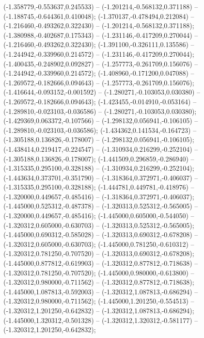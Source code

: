  (-1.358779,-0.553637,0.245533) -- (-1.201214,-0.568132,0.371188) -- (-1.188745,-0.644361,0.410048);
 (-1.370137,-0.478494,0.212084) -- (-1.216460,-0.493262,0.322430) -- (-1.201214,-0.568132,0.371188);
 (-1.380988,-0.402687,0.175343) -- (-1.231146,-0.417209,0.270044) -- (-1.216460,-0.493262,0.322430);
 (-1.391100,-0.326111,0.135586) -- (-1.244942,-0.339960,0.214572) -- (-1.231146,-0.417209,0.270044);
 (-1.400435,-0.248902,0.092827) -- (-1.257773,-0.261709,0.156076) -- (-1.244942,-0.339960,0.214572);
 (-1.408960,-0.171200,0.047088) -- (-1.269572,-0.182666,0.094643) -- (-1.257773,-0.261709,0.156076);
 (-1.416644,-0.093152,-0.001592) -- (-1.280271,-0.103053,0.030380) -- (-1.269572,-0.182666,0.094643);
 (-1.423455,-0.014910,-0.053164) -- (-1.289810,-0.023103,-0.036586) -- (-1.280271,-0.103053,0.030380);
 (-1.429369,0.063372,-0.107566) -- (-1.298132,0.056941,-0.106105) -- (-1.289810,-0.023103,-0.036586);
 (-1.434362,0.141534,-0.164723) -- (-1.305188,0.136826,-0.178007) -- (-1.298132,0.056941,-0.106105);
 (-1.438414,0.219417,-0.224547) -- (-1.310934,0.216299,-0.252104) -- (-1.305188,0.136826,-0.178007);
 (-1.441509,0.296859,-0.286940) -- (-1.315335,0.295100,-0.328188) -- (-1.310934,0.216299,-0.252104);
 (-1.443634,0.373701,-0.351790) -- (-1.318364,0.372971,-0.406037) -- (-1.315335,0.295100,-0.328188);
 (-1.444781,0.449781,-0.418976) -- (-1.320000,0.449657,-0.485416) -- (-1.318364,0.372971,-0.406037);
 (-1.445000,0.525312,-0.487378) -- (-1.320313,0.525312,-0.565005) -- (-1.320000,0.449657,-0.485416);
 (-1.445000,0.605000,-0.544050) -- (-1.320312,0.605000,-0.630703) -- (-1.320313,0.525312,-0.565005);
 (-1.445000,0.690312,-0.585028) -- (-1.320313,0.690312,-0.678208) -- (-1.320312,0.605000,-0.630703);
 (-1.445000,0.781250,-0.610312) -- (-1.320312,0.781250,-0.707520) -- (-1.320313,0.690312,-0.678208);
 (-1.445000,0.877812,-0.619903) -- (-1.320312,0.877812,-0.718638) -- (-1.320312,0.781250,-0.707520);
 (-1.445000,0.980000,-0.613800) -- (-1.320312,0.980000,-0.711562) -- (-1.320312,0.877812,-0.718638);
 (-1.445000,1.087813,-0.592003) -- (-1.320312,1.087813,-0.686294) -- (-1.320312,0.980000,-0.711562);
 (-1.445000,1.201250,-0.554513) -- (-1.320312,1.201250,-0.642832) -- (-1.320312,1.087813,-0.686294);
 (-1.445000,1.320312,-0.501328) -- (-1.320312,1.320312,-0.581177) -- (-1.320312,1.201250,-0.642832);
